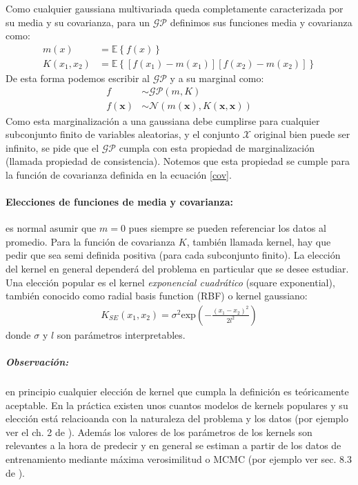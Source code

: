 \documentclass[a4paper]{article}
\newcommand{\gp}{\ensuremath{\mathcal{GP}}}
\begin{document}
Como cualquier gaussiana multivariada queda completamente caracterizada por su media y su covarianza, para un $\gp$ definimos sus funciones media y covarianza como:
\begin{align}
	m(x) &= \mathbb{E}\left\{f(x)\right\}\\
	K(x_1,x_2) &= \mathbb{E}\left\{\left[f(x_1)-m(x_1)\right]\left[f(x_2)-m(x_2)\right]\right\} \label{cov}
\end{align}
De esta forma podemos escribir al $\gp$ y a su marginal como:
\begin{align}
	f &\sim \gp(m,K)\\
	f(\mathbf{x}) &\sim \mathcal{N}(m(\mathbf{x}), K(\mathbf{x},\mathbf{x}))
\end{align}
Como esta marginalización a una gaussiana debe cumplirse para cualquier subconjunto finito de variables aleatorias, y el conjunto $\mathcal{X}$ original bien puede ser infinito, se pide que el $\gp$ cumpla con esta propiedad de marginalización (llamada propiedad de consistencia). Notemos que esta propiedad se cumple para la función de covarianza definida en la ecuación \ref{cov}.

\paragraph{Elecciones de funciones de media y covarianza:} es normal asumir que $m=0$ pues siempre se pueden referenciar los datos al promedio. Para la función de covarianza $K$, también llamada kernel, hay que pedir que sea semi definida positiva (para cada subconjunto finito). La elección del kernel en general dependerá del problema en particular que se desee estudiar. Una elección popular es el kernel \emph{exponencial cuadrático} (square exponential), también conocido como radial basis function (RBF) o kernel gaussiano:
\begin{align}
	K_{SE}(x_1,x_2) = \sigma^2 \text{exp}\left(-\frac{(x_1-x_2)^2}{2l^2}\right) \label{covSE}
\end{align} 
donde $\sigma$ y $l$ son parámetros interpretables.


\subparagraph{Observación:} en principio cualquier elección de kernel que cumpla la definición es teóricamente aceptable. En la práctica existen unos cuantos modelos de kernels populares y su elección está relacioanda con la naturaleza del problema y los datos (por ejemplo ver el ch. 2 de \cite{tesisduvenaud}). Además los valores de los parámetros de los kernels son relevantes a la hora de predecir y en general se estiman a partir de los datos de entrenamiento mediante máxima verosimilitud o MCMC (por ejemplo ver sec. 8.3 de \cite{tobar}).
 
\end{document}
